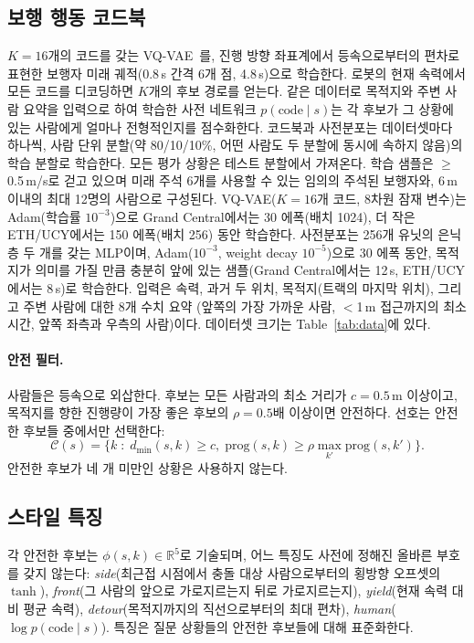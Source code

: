 \subsection{보행 행동 코드북}
\label{sec:candidates}
$K=16$개의 코드를 갖는 VQ-VAE~\citep{vandenoord2017neural}를, 진행 방향 좌표계에서 등속으로부터의 편차로 표현한
보행자 미래 궤적(0.8\,s 간격 6개 점, 4.8\,s)으로 학습한다. 로봇의 현재 속력에서 모든 코드를 디코딩하면 $K$개의 후보 경로를 얻는다.
같은 데이터로 목적지와 주변 사람 요약을 입력으로 하여 학습한 사전 네트워크 $p(\text{code} \mid s)$는
각 후보가 그 상황에 있는 사람에게 얼마나 전형적인지를 점수화한다.
코드북과 사전분포는 데이터셋마다 하나씩, 사람 단위 분할(약 80/10/10\%, 어떤 사람도 두 분할에 동시에 속하지 않음)의 학습 분할로 학습한다.
모든 평가 상황은 테스트 분할에서 가져온다. 학습 샘플은 $\ge$0.5\,m/s로 걷고 있으며 미래 주석 6개를 사용할 수 있는 임의의 주석된 보행자와,
6\,m 이내의 최대 12명의 사람으로 구성된다. VQ-VAE($K=16$개 코드, 8차원 잠재 변수)는 Adam(학습률 $10^{-3}$)으로
Grand Central에서는 30 에폭(배치 1024), 더 작은 ETH/UCY에서는 150 에폭(배치 256) 동안 학습한다.
사전분포는 256개 유닛의 은닉층 두 개를 갖는 MLP이며, Adam($10^{-3}$, weight decay $10^{-5}$)으로 30 에폭 동안,
목적지가 의미를 가질 만큼 충분히 앞에 있는 샘플(Grand Central에서는 12\,s, ETH/UCY에서는 8\,s)로 학습한다.
입력은 속력, 과거 두 위치, 목적지(트랙의 마지막 위치), 그리고 주변 사람에 대한 8개 수치 요약
(앞쪽의 가장 가까운 사람, $<$1\,m 접근까지의 최소 시간, 앞쪽 좌측과 우측의 사람)이다. 데이터셋 크기는 Table~\ref{tab:data}에 있다.

\paragraph{안전 필터.}
사람들은 등속으로 외삽한다. 후보는 모든 사람과의 최소 거리가 $c=0.5$\,m 이상이고, 목적지를 향한
진행량이 가장 좋은 후보의 $\rho=0.5$배 이상이면 안전하다. 선호는 안전한 후보들 중에서만 선택한다:
\begin{equation}
  \mathcal{C}(s) = \bigl\{ k \;:\; d_{\min}(s,k) \ge c,\; \mathrm{prog}(s,k) \ge \rho \max_{k'} \mathrm{prog}(s,k') \bigr\}.
  \label{eq:safe}
\end{equation}
안전한 후보가 네 개 미만인 상황은 사용하지 않는다.

\subsection{스타일 특징}
각 안전한 후보는 $\phi(s,k) \in \mathbb{R}^5$로 기술되며, 어느 특징도 사전에 정해진 올바른 부호를 갖지 않는다:
\emph{side}(최근접 시점에서 충돌 대상 사람으로부터의 횡방향 오프셋의 $\tanh$),
\emph{front}(그 사람의 앞으로 가로지르는지 뒤로 가로지르는지), \emph{yield}(현재 속력 대비 평균 속력),
\emph{detour}(목적지까지의 직선으로부터의 최대 편차), \emph{human}($\log p(\text{code}\mid s)$).
특징은 질문 상황들의 안전한 후보들에 대해 표준화한다.

